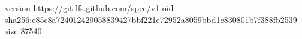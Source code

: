 version https://git-lfs.github.com/spec/v1
oid sha256:e85c8a724012429058839427bbf221e72952a8059bbd1c830801b7f388fb2539
size 87540
